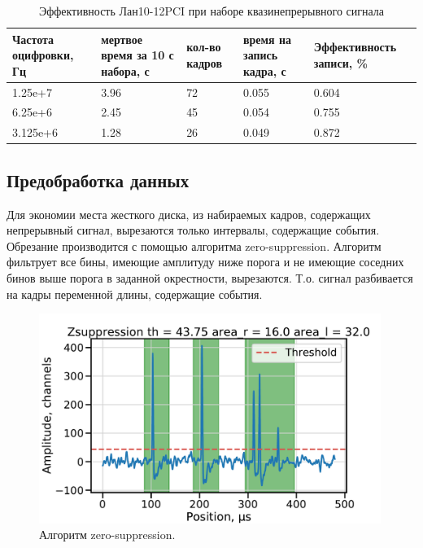 \documentclass[a4paper,14pt]{extreport}
\begin{document}
\begin{table}
    \centering
    \begin{adjustbox}{width=\textwidth}
        \begin{tabular}{|p{}|p{}|p{}|p{}|p{}|}
            \hline
            Частота оцифровки, Гц & мертвое время за 10 с набора, с & кол-во кадров & время на запись кадра, с & Эффективность записи, \% \\
            \hline
            1.25e+7 & 3.96 & 72 & 0.055 & 0.604 \\
            \hline
            6.25e+6 & 2.45 & 45 & 0.054 & 0.755 \\
            \hline
            3.125e+6 & 1.28 & 26 & 0.049 & 0.872 \\
            \hline
        \end{tabular}
    \end{adjustbox}
    \caption{Эффективность Лан10-12PCI при наборе квазинепрерывного сигнала }
    \label{tab:lan-cr-cont}
\end{table}

\subsection{Предобработка данных}
Для экономии места жесткого диска, из набираемых кадров, содержащих непрерывный сигнал, вырезаются только интервалы, содержащие события. Обрезание производится с помощью алгоритма zero-suppression. Алгоритм фильтрует все бины, имеющие амплитуду ниже порога и не имеющие соседних бинов выше порога в заданной окрестности, вырезаются. Т.о. сигнал разбивается на кадры переменной длины, содержащие события.

\begin{figure}
  \centering
  \includegraphics[width = 0.99\textwidth]{img/signals/zsuppression.pdf}
    \caption{Алгоритм zero-suppression.}
    \label{fig:signals-zsuppression}
\end{figure}
\end{document}
